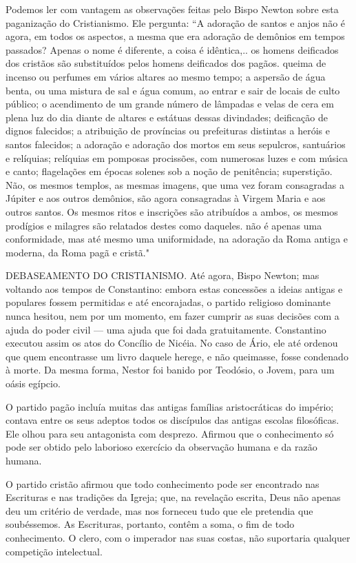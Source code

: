 \documentclass[11pt,a5paper,twoside,openany]{book}
\begin{document}
Podemos ler com vantagem as observações feitas pelo Bispo Newton sobre esta paganização do Cristianismo. Ele pergunta: “A adoração de santos e anjos não é agora, em todos os aspectos, a mesma que era adoração de demônios em tempos passados? Apenas o nome é diferente, a coisa é idêntica,.. os homens deificados dos cristãos são substituídos pelos homens deificados dos pagãos. queima de incenso ou perfumes em vários altares ao mesmo tempo; a aspersão de água benta, ou uma mistura de sal e água comum, ao entrar e sair de locais de culto público; o acendimento de um grande número de lâmpadas e velas de cera em plena luz do dia diante de altares e estátuas dessas divindades; deificação de dignos falecidos; a atribuição de províncias ou prefeituras distintas a heróis e santos falecidos; a adoração e adoração dos mortos em seus sepulcros, santuários e relíquias; relíquias em pomposas procissões, com numerosas luzes e com música e canto; flagelações em épocas solenes sob a noção de penitência; superstição. Não, os mesmos templos, as mesmas imagens, que uma vez foram consagradas a Júpiter e aos outros demônios, são agora consagradas à Virgem Maria e aos outros santos. Os mesmos ritos e inscrições são atribuídos a ambos, os mesmos prodígios e milagres são relatados destes como daqueles. não é apenas uma conformidade, mas até mesmo uma uniformidade, na adoração da Roma antiga e moderna, da Roma pagã e cristã."

DEBASEAMENTO DO CRISTIANISMO. Até agora, Bispo Newton; mas voltando aos tempos de Constantino: embora estas concessões a ideias antigas e populares fossem permitidas e até encorajadas, o partido religioso dominante nunca hesitou, nem por um momento, em fazer cumprir as suas decisões com a ajuda do poder civil — uma ajuda que foi dada gratuitamente. Constantino executou assim os atos do Concílio de Nicéia. No caso de Ário, ele até ordenou que quem encontrasse um livro daquele herege, e não queimasse, fosse condenado à morte. Da mesma forma, Nestor foi banido por Teodósio, o Jovem, para um oásis egípcio.

O partido pagão incluía muitas das antigas famílias aristocráticas do império; contava entre os seus adeptos todos os discípulos das antigas escolas filosóficas. Ele olhou para seu antagonista com desprezo. Afirmou que o conhecimento só pode ser obtido pelo laborioso exercício da observação humana e da razão humana.

O partido cristão afirmou que todo conhecimento pode ser encontrado nas Escrituras e nas tradições da Igreja; que, na revelação escrita, Deus não apenas deu um critério de verdade, mas nos forneceu tudo que ele pretendia que soubéssemos. As Escrituras, portanto, contêm a soma, o fim de todo conhecimento. O clero, com o imperador nas suas costas, não suportaria qualquer competição intelectual.
\end{document}
